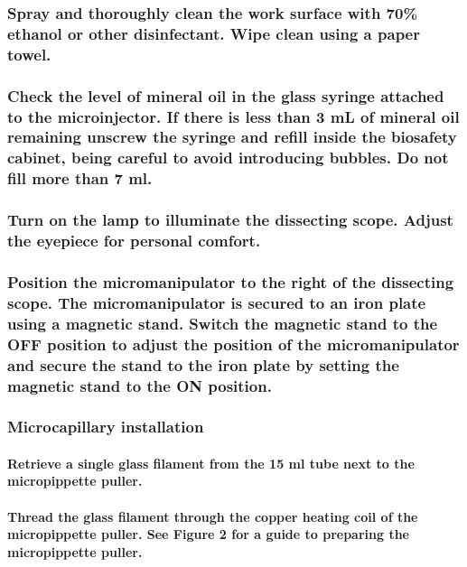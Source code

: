 \documentclass[11pt]{article}
\begin{document}
\subsubsection{{\bfseries\sffamily } Spray and thoroughly clean the work surface with 70\% ethanol or other disinfectant. Wipe clean using a paper towel.}
\label{sec:orgheadline16}
\subsubsection{{\bfseries\sffamily } Check the level of mineral oil in the glass syringe attached to the microinjector. If there is less than 3 mL of mineral oil remaining unscrew the syringe and refill inside the biosafety cabinet, being careful to avoid introducing bubbles. Do not fill more than 7 ml.}
\label{sec:orgheadline17}
\subsubsection{{\bfseries\sffamily } Turn on the lamp to illuminate the dissecting scope. Adjust the eyepiece for personal comfort.}
\label{sec:orgheadline18}
\subsubsection{{\bfseries\sffamily } Position the micromanipulator to the right of the dissecting scope. The micromanipulator is secured to an iron plate using a magnetic stand. Switch the magnetic stand to the OFF position to adjust the position of the micromanipulator and secure the stand to the iron plate by setting the magnetic stand to the ON position.}
\label{sec:orgheadline19}
\subsubsection{{\bfseries\sffamily } Microcapillary installation}
\label{sec:orgheadline40}
\paragraph{{\bfseries\sffamily } Retrieve a single glass filament from the 15 ml tube next to the micropippette puller.}
\label{sec:orgheadline20}
\paragraph{{\bfseries\sffamily } Thread the glass filament through the copper heating coil of the micropippette puller. See \textbf{Figure 2} for a guide to preparing the micropippette puller.}
\label{sec:orgheadline21}
\end{document}
